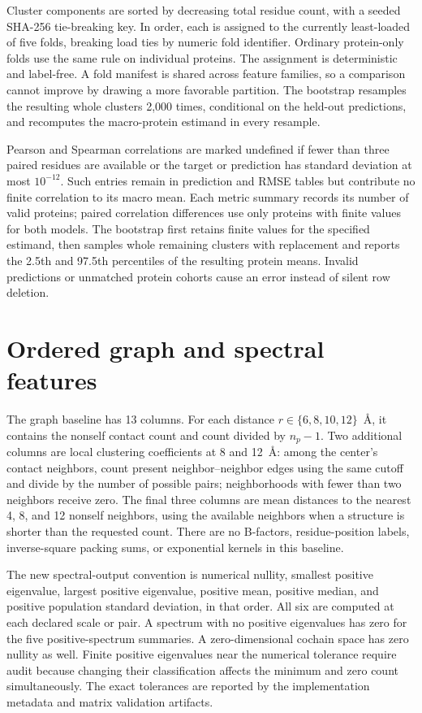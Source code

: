 \documentclass[10pt]{article}
\begin{document}
Cluster components are sorted by decreasing total residue count, with a seeded SHA-256 tie-breaking key. In order, each is assigned to the currently least-loaded of five folds, breaking load ties by numeric fold identifier. Ordinary protein-only folds use the same rule on individual proteins. The assignment is deterministic and label-free. A fold manifest is shared across feature families, so a comparison cannot improve by drawing a more favorable partition. The bootstrap resamples the resulting whole clusters 2,000 times, conditional on the held-out predictions, and recomputes the macro-protein estimand in every resample.

Pearson and Spearman correlations are marked undefined if fewer than three paired residues are available or the target or prediction has standard deviation at most $10^{-12}$. Such entries remain in prediction and RMSE tables but contribute no finite correlation to its macro mean. Each metric summary records its number of valid proteins; paired correlation differences use only proteins with finite values for both models. The bootstrap first retains finite values for the specified estimand, then samples whole remaining clusters with replacement and reports the 2.5th and 97.5th percentiles of the resulting protein means. Invalid predictions or unmatched protein cohorts cause an error instead of silent row deletion.

\section{Ordered graph and spectral features}
The graph baseline has 13 columns. For each distance $r\in\{6,8,10,12\}$~\AA, it contains the nonself contact count and count divided by $n_p-1$. Two additional columns are local clustering coefficients at 8 and 12~\AA: among the center's contact neighbors, count present neighbor--neighbor edges using the same cutoff and divide by the number of possible pairs; neighborhoods with fewer than two neighbors receive zero. The final three columns are mean distances to the nearest 4, 8, and 12 nonself neighbors, using the available neighbors when a structure is shorter than the requested count. There are no B-factors, residue-position labels, inverse-square packing sums, or exponential kernels in this baseline.

The new spectral-output convention is numerical nullity, smallest positive eigenvalue, largest positive eigenvalue, positive mean, positive median, and positive population standard deviation, in that order. All six are computed at each declared scale or pair. A spectrum with no positive eigenvalues has zero for the five positive-spectrum summaries. A zero-dimensional cochain space has zero nullity as well. Finite positive eigenvalues near the numerical tolerance require audit because changing their classification affects the minimum and zero count simultaneously. The exact tolerances are reported by the implementation metadata and matrix validation artifacts.
\end{document}

